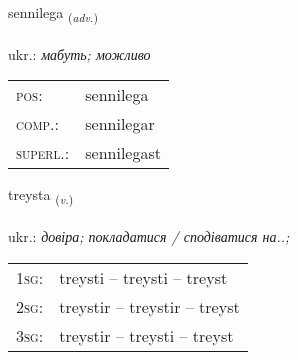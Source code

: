 \documentclass[frontgrid, backgrid]{flacards}\usepackage[]{graphicx}\usepackage[]{xcolor}
\begin{document}
\renewcommand{\flhead}{\vskip5pt \fboxsep=0pt {\small\bfseries\footnotesize Atviksorð | прислівник}}
\renewcommand{\fcfoot}{\vskip5pt \fboxsep=0pt \hspace{2pt}{\small\bfseries\footnotesize 1K}}

\renewcommand{\blhead}{\vskip5pt {\small\bfseries\footnotesize Atviksorð | прислівник }}
\renewcommand{\bcfoot}{\vskip5pt \hspace{2pt}{\small\bfseries\footnotesize 1K}}


{sennilega \small{\textsubscript{(\textit{adv.})}} \\[1ex] %
\textphonetic{[sɛnɪlɛɣa]} \\
ukr.: \emph{мабуть; можливо} \\  [2ex]
\renewcommand*{\arraystretch}{0.8}
\begin{tabular}{ll}
\textsc{pos}: & sennilega \\ 
\textsc{comp.}: & sennilegar \\ 
\textsc{superl.}: & sennilegast \\
\end{tabular}
}

\renewcommand{\flhead}{\vskip5pt \fboxsep=0pt {\small\bfseries\footnotesize Sagnorð | дієслово}}
\renewcommand{\fcfoot}{\vskip5pt \fboxsep=0pt \hspace{2pt}{\small\bfseries\footnotesize 1K}}

\renewcommand{\blhead}{\vskip5pt {\small\bfseries\footnotesize Sagnorð | дієслово }}
\renewcommand{\bcfoot}{\vskip5pt \hspace{2pt}{\small\bfseries\footnotesize 1K}}


{treysta \small{\textsubscript{(\textit{v.})}} \\[1ex] %
\textphonetic{[tʰreista]} \\
ukr.: \emph{довіра; покладатися / сподіватися на..;} \\  [2ex]
\renewcommand*{\arraystretch}{0.8}
\begin{tabular}{p{1cm}l}
\textsc{1sg}: & treysti -- treysti -- treyst \\ 
\textsc{2sg}: & treystir -- treystir -- treyst \\ 
\textsc{3sg}: & treystir -- treysti -- treyst \\ 
\end{tabular}
}
\end{document}
